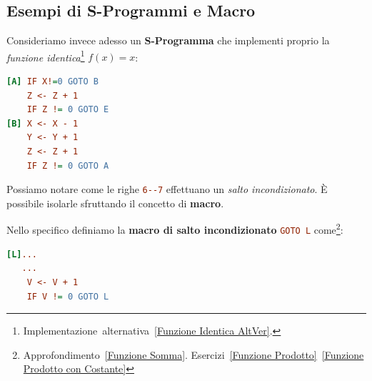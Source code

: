 \subsection{Esempi di S-Programmi e Macro}

Consideriamo invece adesso un \textbf{S-Programma} che implementi proprio la \textit{funzione identica}\footnote{Implementazione~alternativa~\ref{Funzione Identica AltVer}.} \(f(x) = x\):

\begin{lstlisting}[language=ini, label={Funzione Identica}, caption=Funzione identica]
[A] IF X!=0 GOTO B
    Z <- Z + 1
    IF Z != 0 GOTO E
[B] X <- X - 1
    Y <- Y + 1
    Z <- Z + 1
    IF Z != 0 GOTO A
\end{lstlisting}

Possiamo notare come le righe \lstinline[language=ini]{6--7} effettuano un \textit{salto incondizionato}. È possibile isolarle sfruttando il concetto di \textbf{macro}.

Nello specifico definiamo la \textbf{macro di salto incondizionato} \lstinline[language=ini]{GOTO L} come\footnote{Approfondimento~\ref{Funzione Somma}. Esercizi~\ref{Funzione Prodotto}~\ref{Funzione Prodotto con Costante}}:

\begin{lstlisting}[language=ini, label={Salto Incondizionato},  caption=Macro di salto incondizionato]
[L]...
   ...
    V <- V + 1
    IF V != 0 GOTO L
\end{lstlisting}

